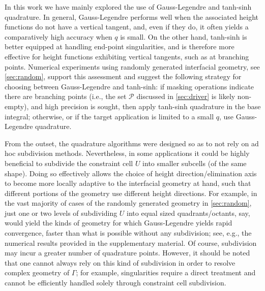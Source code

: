 \documentclass[onefignum,onetabnum,onealgnum,oneeqnum]{siamart190516}
\begin{document}
%


In this work we have mainly explored the use of Gauss-Legendre and tanh-sinh quadrature. In general, Gauss-Legendre performs well when the associated height functions do not have a vertical tangent, and, even if they do, it often yields a comparatively high accuracy when $q$ is small. On the other hand, tanh-sinh is better equipped at handling end-point singularities, and is therefore more effective for height functions exhibiting vertical tangents, such as at branching points. Numerical experiments using randomly generated interfacial geometry, see \cref{sec:random}, support this assessment and suggest the following strategy for choosing between Gauss-Legendre and tanh-sinh: if masking operations indicate there are branching points (i.e., the set $\mathcal P$ discussed in \cref{sec:driver} is likely non-empty), and high precision is sought, then apply tanh-sinh quadrature in the base integral; otherwise, or if the target application is limited to a small $q$, use Gauss-Legendre quadrature.

From the outset, the quadrature algorithms were designed so as to not rely on ad hoc subdivision methods. Nevertheless, in some applications it could be highly beneficial to subdivide the constraint cell $U$ into smaller subcells (of the same shape). Doing so effectively allows the choice of height direction/elimination axis to become more locally adaptive to the interfacial geometry at hand, such that different portions of the geometry use different height directions. For example, in the vast majority of cases of the randomly generated geometry in \cref{sec:random}, just one or two levels of subdividing $U$ into equal sized quadrants/octants, say, would yield the kinds of geometry for which Gauss-Legendre yields rapid convergence, faster than what is possible without any subdivision; see, e.g., the numerical results provided in the supplementary material. Of course, subdivision may incur a greater number of quadrature points. However, it should be noted that one cannot always rely on this kind of subdivision in order to resolve complex geometry of $\Gamma$; for example, singularities require a direct treatment and cannot be efficiently handled solely through constraint cell subdivision.
\end{document}
